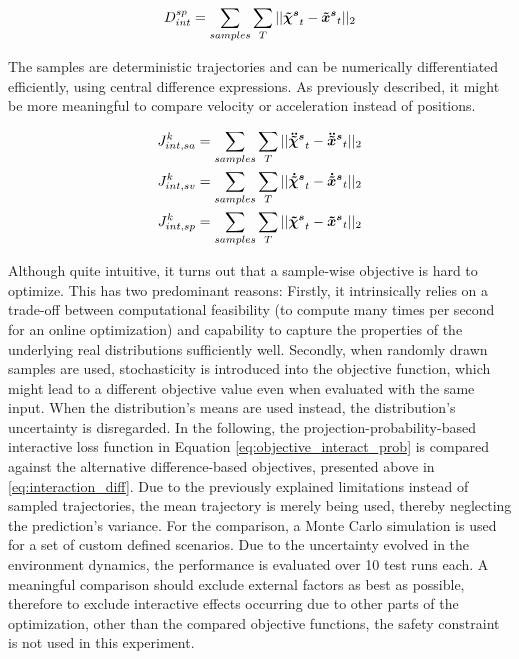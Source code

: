 \begin{equation}
D_{int}^{sp} = \sum_{samples} \sum_T ||\xpedwo[s]_t - \xped[s]_t||_2
\end{equation}

The samples are deterministic trajectories and can be numerically differentiated efficiently, using central difference expressions. As previously described, it might be more meaningful to compare velocity or acceleration instead of positions.

\begin{align}
J_{int, sa}^{k} &= \sum_{samples} \sum_T ||\ddxpedwo[s]_t - \ddxped[s]_t||_2	 \\
J_{int, sv}^{k} &= \sum_{samples} \sum_T ||\dxpedwo[s]_t - \dxped[s]_t||_2	 \\
J_{int, sp}^{k} &= \sum_{samples} \sum_T ||\xpedwo[s]_t - \xped[s]_t||_2
\label{eq:interaction_diff}	
\end{align}

Although quite intuitive, it turns out that a sample-wise objective is hard to optimize. This has two predominant reasons: Firstly, it intrinsically relies on a trade-off between computational feasibility (to compute many times per second for an online optimization) and capability to capture the properties of the underlying real distributions sufficiently well. Secondly, when randomly drawn samples are used, stochasticity is introduced into the objective function, which might lead to a different objective value even when evaluated with the same input. When the distribution's means are used instead, the distribution's uncertainty is disregarded.
\newline
In the following, the projection-probability-based interactive loss function in Equation \ref{eq:objective_interact_prob} is compared against the alternative difference-based objectives, presented above in \ref{eq:interaction_diff}. Due to the previously explained limitations instead of sampled trajectories, the mean trajectory is merely being used, thereby neglecting the prediction's variance. For the comparison, a Monte Carlo simulation is used for a set of custom defined scenarios. Due to the uncertainty evolved in the environment dynamics, the performance is evaluated over 10 test runs each. A meaningful comparison should exclude external factors as best as possible, therefore to exclude interactive effects occurring due to other parts of the optimization, other than the compared objective functions, the safety constraint is not used in this experiment. \\ 

